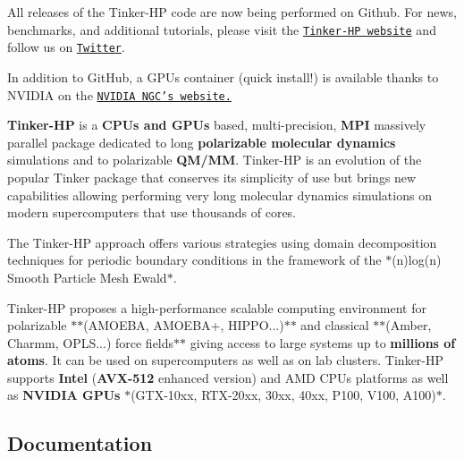 All releases of the Tinker-\/\-H\-P code are now being performed on Github. For news, benchmarks, and additional tutorials, please visit the \href{https://tinker-hp.org/}{\tt Tinker-\/\-H\-P website} and follow us on \href{https://twitter.com/TINKERtoolsMD}{\tt Twitter}.

In addition to Git\-Hub, a G\-P\-Us container (quick install!) is available thanks to N\-V\-I\-D\-I\-A on the \href{https://ngc.nvidia.com/catalog/containers/hpc:tinkerhp}{\tt N\-V\-I\-D\-I\-A N\-G\-C's website.} 



{\bfseries Tinker-\/\-H\-P} is a {\bfseries C\-P\-Us and G\-P\-Us} based, multi-\/precision, {\bfseries M\-P\-I} massively parallel package dedicated to long {\bfseries polarizable molecular dynamics} simulations and to polarizable {\bfseries Q\-M/\-M\-M}. Tinker-\/\-H\-P is an evolution of the popular Tinker package that conserves its simplicity of use but brings new capabilities allowing performing very long molecular dynamics simulations on modern supercomputers that use thousands of cores.

The Tinker-\/\-H\-P approach offers various strategies using domain decomposition techniques for periodic boundary conditions in the framework of the $\ast$(n)log(n) Smooth Particle Mesh Ewald$\ast$.

Tinker-\/\-H\-P proposes a high-\/performance scalable computing environment for polarizable $\ast$$\ast$(A\-M\-O\-E\-B\-A, A\-M\-O\-E\-B\-A+, H\-I\-P\-P\-O...)$\ast$$\ast$ and classical $\ast$$\ast$(Amber, Charmm, O\-P\-L\-S...) force fields$\ast$$\ast$ giving access to large systems up to {\bfseries millions of atoms}. It can be used on supercomputers as well as on lab clusters. Tinker-\/\-H\-P supports {\bfseries Intel} ({\bfseries A\-V\-X-\/512} enhanced version) and A\-M\-D C\-P\-Us platforms as well as {\bfseries N\-V\-I\-D\-I\-A G\-P\-Us} $\ast$(G\-T\-X-\/10xx, R\-T\-X-\/20xx, 30xx, 40xx, P100, V100, A100)$\ast$. 



\subsection*{Documentation}

